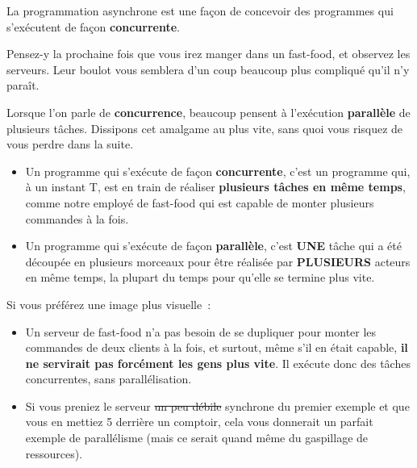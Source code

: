 \documentclass[small]{zmdocument}
\begin{document}
\begin{Information}
La programmation asynchrone est une façon de concevoir des programmes qui s’exécutent de façon \textbf{concurrente}.
\end{Information}


Pensez-y la prochaine fois que vous irez manger dans un fast-food, et observez
les serveurs. Leur boulot vous semblera d’un coup beaucoup plus compliqué qu’il
n’y paraît. 





Lorsque l’on parle de \textbf{concurrence}, beaucoup pensent à l’exécution \textbf{parallèle} de plusieurs tâches. Dissipons cet amalgame au plus vite, sans quoi vous risquez de vous perdre dans la suite.



\begin{itemize}
\item\relax Un programme qui s’exécute de façon \textbf{concurrente}, c’est un programme qui, à un instant T, est en train de réaliser \textbf{plusieurs tâches en même temps}, comme notre employé de fast-food qui est capable de monter plusieurs commandes à la fois.
\item\relax Un programme qui s’exécute de façon \textbf{parallèle}, c’est \textbf{UNE} tâche qui a été découpée en plusieurs morceaux pour être réalisée par \textbf{PLUSIEURS} acteurs en même temps, la plupart du temps pour qu’elle se termine plus vite.
\end{itemize}


Si vous préférez une image plus visuelle :



\begin{itemize}
\item\relax Un serveur de fast-food n’a pas besoin de se dupliquer pour monter les commandes de deux clients à la fois, et surtout, même s’il en était capable, \textbf{il ne servirait pas forcément les gens plus vite}. Il exécute donc des tâches concurrentes, sans parallélisation.
\item\relax Si vous preniez le serveur \sout{un peu débile} synchrone du premier exemple et que vous en mettiez 5 derrière un comptoir, cela vous donnerait un parfait exemple de parallélisme (mais ce serait quand même du gaspillage de ressources). 
\end{itemize}
\end{document}
